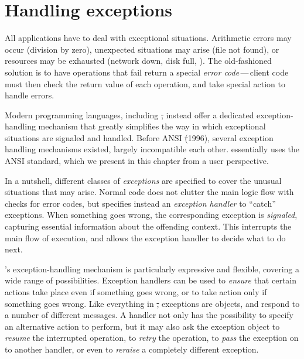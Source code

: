 \documentclass[a4paper,10pt,twoside]{book}
\begin{document}
	\sloppy
\fi


\chapter{Handling exceptions}



All applications have to deal with exceptional situations.
Arithmetic errors may occur (division by zero), unexpected situations may arise (file not found), or resources may be exhausted (network down, disk full, \etc).
The old-fashioned solution is to have operations that fail return a special \emph{error code}\,---\,client code must then check the return value of each operation, and take special action to handle errors.

Modern programming languages, including \st, instead offer a dedicated exception-handling mechanism that greatly simplifies the way in which exceptional situations are signaled and handled.
Before ANSI \st (1996), several  exception handling mechanisms existed, largely incompatible each other. \pharo essentially uses the ANSI standard, which we present in this chapter from a user perspective.

In a nutshell, different classes of \emph{exceptions} are specified to cover the unusual situations that may arise.
Normal code does not clutter the main logic flow with checks for error codes, but specifies instead an \emph{exception handler} to ``catch'' exceptions.
When something goes wrong, the corresponding exception is \emph{signaled}, capturing essential information about the offending context.
This interrupts the main flow of execution, and allows the exception handler to decide what to do next.

\pharo's exception-handling mechanism is particularly expressive and flexible, covering a wide range of possibilities. Exception handlers can be used to \emph{ensure} that certain actions take place even if something goes wrong, or to take action only if something goes wrong.
Like everything in \st, exceptions are objects, and respond to a number of different messages.
A handler not only has the possibility to specify an alternative action to perform, but it may also ask the exception object to \emph{resume} the interrupted operation, to \emph{retry} the operation, to \emph{pass} the exception on to another handler, or even to \emph{reraise} a completely different exception.
\end{document}
